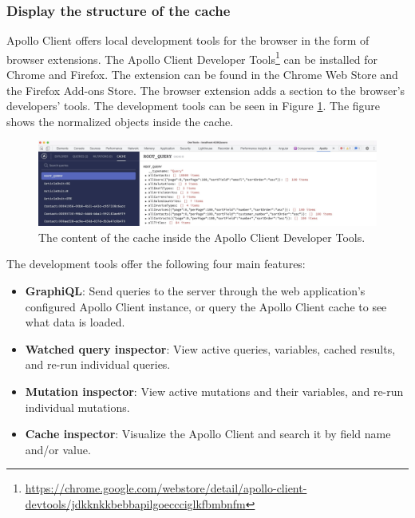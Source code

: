 \subsubsection{Display the structure of the cache}\label{subsubsection:background:graphql:apollo-server-client:understanding-cache-structure}

Apollo Client offers local development tools for the browser in the form of browser extensions. The Apollo Client Developer Tools\footnote{\url{https://chrome.google.com/webstore/detail/apollo-client-devtools/jdkknkkbebbapilgoeccciglkfbmbnfm}} can be installed for Chrome and Firefox. The extension can be found in the Chrome Web Store and the Firefox Add-ons Store. The browser extension adds a section to the browser's developers' tools. \cite{misc:-:background:graphql:apollo-developer-tools} The development tools can be seen in Figure \ref{fig:background:graphql:apollo:apollo-dev-tools}. The figure shows the normalized objects inside the cache.

\ifshowImages
  \begin{figure}[H]
    \centering
    \includegraphics[width=1\linewidth]{images/background/graphql/apollo/apollo-dev-tools.jpg}
    \caption{The content of the cache inside the Apollo Client Developer Tools.}\label{fig:background:graphql:apollo:apollo-dev-tools}
  \end{figure}
\fi

\noindent The development tools offer the following four main features: \cite{misc:-:background:graphql:apollo-developer-tools}

\begin{itemize}
  \item \textbf{GraphiQL}: Send queries to the server through the web application's configured Apollo Client instance, or query the Apollo Client cache to see what data is loaded.
  \item \textbf{Watched query inspector}: View active queries, variables, cached results, and re-run individual queries.
  \item \textbf{Mutation inspector}: View active mutations and their variables, and re-run individual mutations.
  \item \textbf{Cache inspector}: Visualize the Apollo Client and search it by field name and/or value.
\end{itemize}

